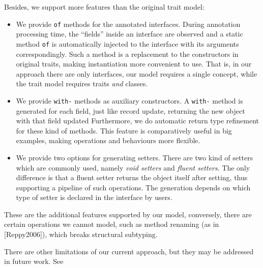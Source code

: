 Besides, we support more features than the original trait model:
\begin{itemize}
\item We provide \texttt{of} methods for the annotated interfaces. During annotation processing time, the ``fields'' inside an interface are observed and a static method \texttt{of} is automatically injected to the interface with its arguments correspondingly. Such a method is a replacement to the constructors in original traits, making instantiation more convenient to use.
That is, in our approach there are only interfaces, our model requires a single concept, while the trait model requires traits \emph{and} classes.

\item We provide \texttt{with-} methods as auxiliary constructors. A \texttt{with-} method is generated for each field, just like record update, returning the new object with that field updated
Furthermore, we do automatic return type refinement for these kind of methods. This feature is comparatively useful in big examples, making operations and behaviours more flexible.%
\item We provide two options for generating setters. There are two kind of setters which are commonly used, namely \textit{void setters} and \textit{fluent setters}. The only difference is that a fluent setter returns the object itself after setting, thus supporting a pipeline of such operations. The generation depends on which type of setter is declared in the interface by users.
\end{itemize}

These are the additional features supported by our model, conversely, there are certain operations we cannot model, such as method renaming (as in [Reppy2006]), which breaks structural subtyping.

There are other limitations of our current approach, but they may be addressed in future work. See 


